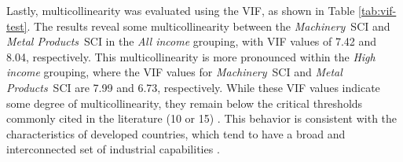 \documentclass[10pt]{article}
\newcommand{\MA}{\textit{Machinery}}
\newcommand{\ME}{\textit{Metal Products}}
\begin{document}
Lastly, multicollinearity was evaluated using the VIF, as shown in Table \ref{tab:vif-test}. The results reveal some multicollinearity between the \MA\ SCI and \ME\ SCI in the \textit{All income} grouping, with VIF values of 7.42 and 8.04, respectively. This multicollinearity is more pronounced within the \textit{High income} grouping, where the VIF values for \MA\ SCI and \ME\ SCI are 7.99 and 6.73, respectively. While these VIF values indicate some degree of multicollinearity, they remain below the critical thresholds commonly cited in the literature (10 or 15) \citep{dormannCollinearityReviewMethods2013, obrienCautionRegardingRules2007}. This behavior is consistent with the characteristics of developed countries, which tend to have a broad and interconnected set of industrial capabilities \citep{10.1007/978-3-319-96661-8_46}.
\end{document}
